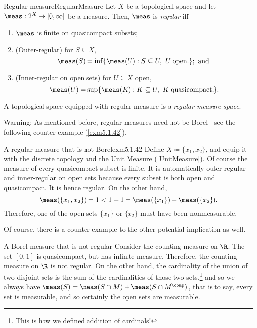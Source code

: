 \begin{dfn}{Regular measure}{RegularMeasure}
Let $X$ be a topological space and let $\meas :2^X\rightarrow [0,\infty ]$ be a measure.  Then, $\meas$ is \emph{regular} iff
\begin{enumerate}
\item $\meas$ is finite on quasicompact subsets;
\item (Outer-regular) for $S\subseteq X$,
\begin{equation}
\meas (S)=\inf \{ \meas (U):S\subseteq U,\ U\text{ open.}\} ;\text{ and }
\end{equation}
\item (Inner-regular on open sets) for $U\subseteq X$ open,
\begin{equation}
\meas (U)=\sup \{ \meas (K):K\subseteq U,\ K\text{ quasicompact.}\} .
\end{equation}
\end{enumerate}
A topological space equipped with regular measure is a \emph{regular measure space}.
\begin{wrn}
Warning:  As mentioned before, regular measures need not be Borel---see the following counter-example (\cref{exm5.1.42}).
\end{wrn}
\end{dfn}
\begin{exm}{A regular measure that is not Borel}{exm5.1.42}
Define $X\coloneqq \{ x_1,x_2\}$, and equip it with the discrete topology and the Unit Measure (\cref{UnitMeasure}).  Of course the measure of every quasicompact subset is finite.  It is automatically outer-regular and inner-regular on open sets because every subset is both open and quasicompact.  It is hence regular.  On the other hand,
\begin{equation}
\meas (\{ x_1,x_2\} )=1<1+1=\meas (\{ x_1\} )+\meas (\{ x_2\} ).
\end{equation}
Therefore, one of the open sets $\{ x_1\}$ or $\{ x_2\}$ must have been nonmeasurable.
\end{exm}
Of course, there is a counter-example to the other potential implication as well.
\begin{exm}{A Borel measure that is not regular}{}
Consider the counting measure on $\R$.  The set $[0,1]$ is quasicompact, but has infinite measure.  Therefore, the counting measure on $\R$ is not regular.  On the other hand, the cardinality of the union of two disjoint sets is the sum of the cardinalities of those two sets,\footnote{This is how we defined addition of cardinals!} and so we always have $\meas (S)=\meas (S\cap M)+\meas (S\cap M^{\comp})$, that is to say, every set is measurable, and so certainly the open sets are measurable.
\end{exm}

